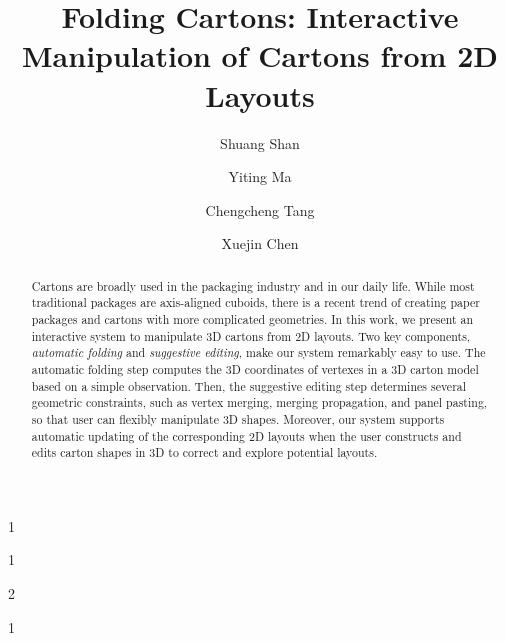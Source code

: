 \documentclass{gmp2018}
\begin{document}
%
%
\title{Folding Cartons: Interactive Manipulation of Cartons from 2D Layouts}

%

%
%
\author{Shuang Shan}{1}
\author{Yiting Ma}{1}
\author{Chengcheng Tang}{2}
\author{Xuejin Chen}{1}

%
%

%
%
 

 
\newcommand{\vo}{\hat{\mathbf{v}}}
\newcommand{\vn}{\mathbf{v}}
\newcommand{\vset}{\mathbb{V}}




\maketitle

\begin{abstract}
Cartons are broadly used in the packaging industry and in our daily life. While most traditional packages are axis-aligned cuboids, there is a recent trend of creating paper packages and cartons with more complicated geometries. In this work, we present an interactive system to manipulate 3D cartons from 2D layouts. Two key components, \emph{automatic folding} and \emph{suggestive editing}, make our system remarkably easy to use. 
The automatic folding step computes the 3D coordinates of vertexes in a 3D carton model based on a simple observation. Then, the suggestive editing step determines several geometric constraints, such as vertex merging, merging propagation, and panel pasting, so that user can flexibly manipulate 3D shapes.
Moreover, our system supports automatic updating of the corresponding 2D layouts when the user constructs and edits carton shapes in 3D to correct and explore potential layouts.  
\end{abstract}
\end{document}
